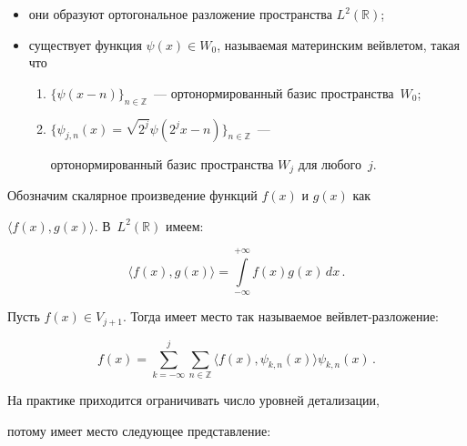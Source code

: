 \begin{itemize}

    \item  они образуют ортогональное разложение пространства $L^2(\mathbb{R})$;

    \item  существует функция $\psi(x) \in W_0$, называемая материнским вейвлетом, такая что

    \begin{enumerate}[(1)]

        \item  $\{\psi(x-n)\}_{n \in \mathbb{Z}}$~--- ортонормированный базис пространства~$W_0$;

        \item  $\{\psi_{j,n}(x)=\sqrt{2^j}\psi(2^jx-n)\}_{n \in \mathbb{Z}}$~--- 

        ортонормированный базис пространства $W_j$ для любого~$j$.

    \end{enumerate}

\end{itemize}



Обозначим скалярное произведение функций $f(x)$ и $g(x)$ как

$\langle f(x),g(x)\rangle$. В~$L^2(\mathbb{R})$ имеем:

\begin{equation}

        \langle f(x),g(x)\rangle=\int\limits_{-\infty}^{+\infty}{f(x)g(x)\,dx}\,.

            \label{integr_koeff}

\end{equation}



Пусть $f(x) \in V_{j+1}$. Тогда имеет место так называемое вейвлет-разложение:

\begin{equation*}

    \label{infin_decomposition}

        f(x)=\sum_{k=-\infty}^{j}

        {\sum_{n \in \mathbb{Z}}{\langle f(x),\psi_{k,n}(x)\rangle\psi_{k,n}(x)}}\,.

\end{equation*}



На практике приходится ограничивать число уровней детализации,

потому имеет место следующее представление:

